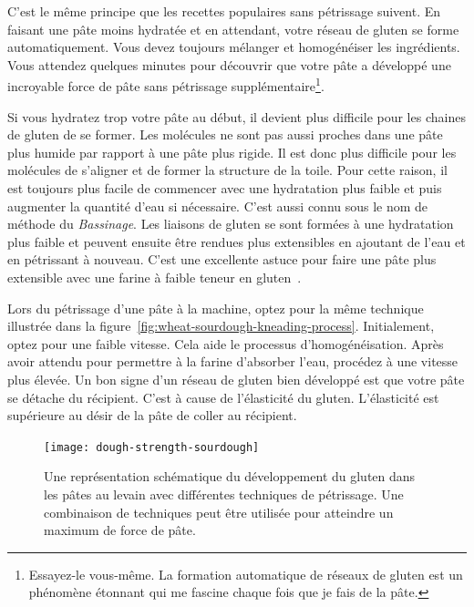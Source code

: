 C'est le même principe que les recettes populaires sans pétrissage suivent. En faisant une pâte moins
hydratée et en attendant, votre réseau de gluten se forme automatiquement. Vous devez toujours
mélanger et homogénéiser les ingrédients. Vous attendez quelques minutes pour découvrir que votre pâte a développé une incroyable force de pâte sans pétrissage supplémentaire\footnote{Essayez-le vous-même. La formation automatique de réseaux de gluten est un phénomène étonnant qui me fascine chaque fois que je fais de la pâte.}.

Si vous hydratez trop votre pâte au début, il devient plus difficile
pour les chaines de gluten de se former. Les molécules ne sont pas aussi proches dans
une pâte plus humide par rapport à une pâte plus rigide. Il est donc plus difficile pour les molécules
de s'aligner et de former la structure de la toile. Pour cette raison, il est toujours plus facile
de commencer avec une hydratation plus faible et puis augmenter la quantité d'eau si nécessaire.
C'est aussi connu sous le nom de méthode du \emph{Bassinage}. Les liaisons de gluten
se sont formées à une hydratation plus faible et peuvent ensuite être rendues plus extensibles
en ajoutant de l'eau et en pétrissant à nouveau. C'est une excellente astuce pour faire
une pâte plus extensible avec une farine à faible teneur en gluten~\cite{bassinage+technique}.

Lors du pétrissage d'une pâte à la machine, optez pour la même technique illustrée dans
la figure~\ref{fig:wheat-sourdough-kneading-process}. Initialement, optez pour une faible
vitesse. Cela aide le processus d'homogénéisation.
Après avoir attendu pour permettre à la farine d'absorber l'eau, procédez à une vitesse plus élevée.
Un bon signe d'un réseau de gluten bien développé est
que votre pâte se détache du récipient. C'est à cause de l'élasticité du gluten.
L'élasticité est supérieure au désir de la
pâte de coller au récipient.

\begin{figure}[!htb]
  \texttt{[image: dough-strength-sourdough]}
  \caption[Résistance de la pâte dans le temps avec le pétrissage]{Une représentation schématique du développement du gluten dans les pâtes au levain avec différentes techniques de pétrissage.
      Une combinaison de techniques peut être utilisée pour atteindre un maximum de force de pâte.}%
  \label{fig:dough-strength-sourdough}
\end{figure}

